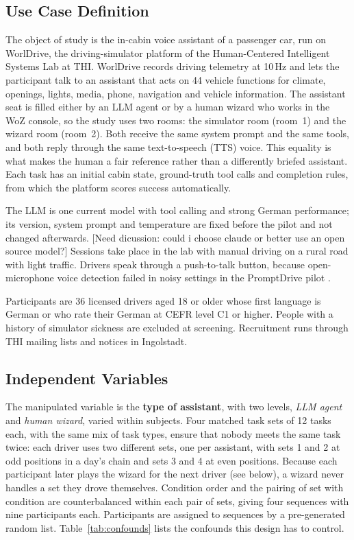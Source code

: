 \documentclass[
    a4paper,
    11pt,
    DIV=11,
    bigheadings,
    idxtotoc,
    listof=totoc,
    bibtotoc,
    halfparskip,
    cleardoubleempty,
    openright,
    oneside
]{scrartcl}
\begin{document}
\subsection{Use Case Definition}

The object of study is the in-cabin voice assistant of a passenger car, run on WorlDrive, the driving-simulator platform of the Human-Centered Intelligent Systems Lab at THI.
WorlDrive records driving telemetry at 10\,Hz and lets the participant talk to an assistant that acts on 44 vehicle functions for climate, openings, lights, media, phone, navigation and vehicle information.
The assistant seat is filled either by an LLM agent or by a human wizard who works in the WoZ console, so the study uses two rooms: the simulator room (room~1) and the wizard room (room~2).
Both receive the same system prompt and the same tools, and both reply through the same text-to-speech (TTS) voice.
This equality is what makes the human a fair reference rather than a differently briefed assistant.
Each task has an initial cabin state, ground-truth tool calls and completion rules, from which the platform scores success automatically.

The LLM is one current model with tool calling and strong German performance; its version, system prompt and temperature are fixed before the pilot and not changed afterwards.
[Need dicussion: could i choose claude or better use an open source model?]
Sessions take place in the lab with manual driving on a rural road with light traffic.
Drivers speak through a push-to-talk button, because open-microphone voice detection failed in noisy settings in the PromptDrive pilot \cite{Alvarez26Do}.

Participants are 36 licensed drivers aged 18 or older whose first language is German or who rate their German at CEFR level C1 or higher.
People with a history of simulator sickness are excluded at screening.
Recruitment runs through THI mailing lists and notices in Ingolstadt.

\subsection{Independent Variables}

The manipulated variable is the \textbf{type of assistant}, with two levels, \emph{LLM agent} and \emph{human wizard}, varied within subjects.
Four matched task sets of 12 tasks each, with the same mix of task types, ensure that nobody meets the same task twice: each driver uses two different sets, one per assistant, with sets 1 and 2 at odd positions in a day's chain and sets 3 and 4 at even positions.
Because each participant later plays the wizard for the next driver (see below), a wizard never handles a set they drove themselves.
Condition order and the pairing of set with condition are counterbalanced within each pair of sets, giving four sequences with nine participants each.
Participants are assigned to sequences by a pre-generated random list.
Table~\ref{tab:confounds} lists the confounds this design has to control.
\end{document}
